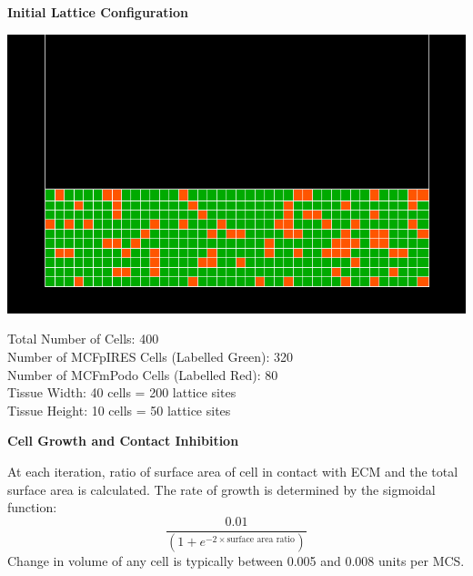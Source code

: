 \documentclass[landscape,a0paper,fontscale=0.292]{baposter}
\begin{document}
\begin{poster}
{\begin{center}
\textbf{Initial Lattice Configuration}
\end{center}
\begin{center}
\includegraphics[scale=0.15]{latticecpm} 
\end{center}
\vspace{-0.1cm}
Total Number of Cells: 400\\
Number of MCFpIRES Cells (Labelled Green): 320\\
Number of MCFmPodo Cells (Labelled Red): 80\\
Tissue Width: 40 cells = 200 lattice sites\\
Tissue Height: 10 cells = 50 lattice sites
\begin{center}
\textbf{Cell Growth and Contact Inhibition}
\end{center}
\vspace{-0.1cm}
At each iteration, ratio of surface area of cell in contact with ECM and the total surface area is calculated. The rate of growth is determined by the sigmoidal function:
\begin{equation}
\frac{0.01}{(1 + e^{-2 \times \mbox{surface area ratio}})} \nonumber
\end{equation}
Change in volume of any cell is typically between 0.005 and 0.008 units per MCS.
}


\end{poster}
\end{document}
